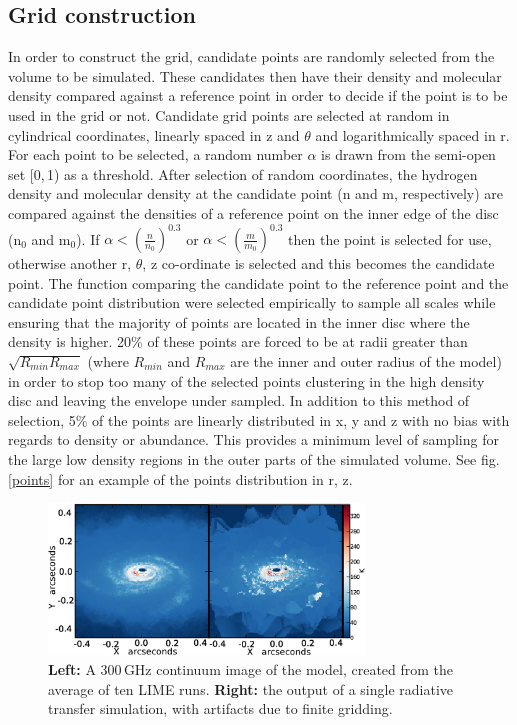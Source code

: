 \documentclass[useAMS,usenatbib]{mn2e}
\begin{document}
\subsection{Grid construction} \label{subsec:gridding}
In order to construct the grid, candidate points are randomly selected from the volume to be simulated. These candidates then have their density and molecular density compared against a reference point in order to decide if the point is to be used in the grid or not. Candidate grid points are selected at random in cylindrical coordinates, linearly spaced in z and $\theta$ and logarithmically spaced in r. For each point to be selected, a random number $\alpha$ is drawn from the semi-open set [0,$\,$1) as a threshold. After selection of random coordinates, the hydrogen density and molecular density at the candidate point (n and m, respectively) are compared against the densities of a reference point on the inner edge of the disc (n$_0$ and m$_0$). If $\alpha<\left( \frac{n}{n_0} \right)^{0.3}$ or $\alpha< \left( \frac{m}{m_0} \right)^{0.3}$ then the point is selected for use, otherwise another r, $\theta$, z co-ordinate is selected and this becomes the candidate point. The function comparing the candidate point to the reference point and the candidate point distribution were selected empirically to sample all scales while ensuring that the majority of points are located in the inner disc where the density is higher. 20\% of these points are forced to be at radii greater than $\sqrt{R_{min}R_{max}}$ (where $R_{min}$ and $R_{max}$ are the inner and outer radius of the model) in order to stop too many of the selected points clustering in the high density disc and leaving the envelope under sampled. In addition to this method of selection, 5\% of the points are linearly distributed in x, y and z with no bias with regards to density or abundance. This provides a minimum level of sampling for the large low density regions in the outer parts of the simulated volume. See fig. \ref{points} for an example of the points distribution in r, z. \smallskip

\begin{figure}
 \includegraphics[width=84mm]{Figures/sim/continuum2.eps}
 \caption{{\bf Left:} A 300$\,$GHz continuum image of the model, created from the average of ten LIME runs. {\bf Right:} the output of a single radiative transfer simulation, with artifacts due to finite gridding.}
 \label{averages}
\end{figure}
\end{document}
